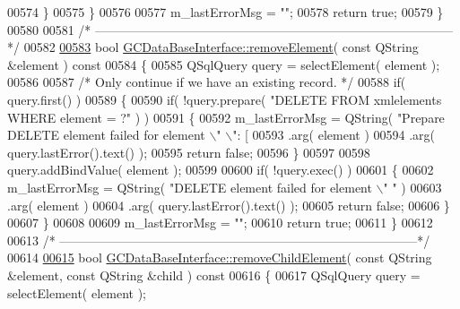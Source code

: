 \begin{DoxyCode}
{{{{{{{{{{{{{{{{{{{{{{{{{{00574     \}
00575   \}
00576 
00577   m\_lastErrorMsg = \textcolor{stringliteral}{""};
00578   \textcolor{keywordflow}{return} \textcolor{keyword}{true};
00579 \}
00580 
00581 \textcolor{comment}{/*
      --------------------------------------------------------------------------------------*/}
00582 
\hypertarget{gcdatabaseinterface_8cpp_source_l00583}{}\hyperlink{class_g_c_data_base_interface_ad8aa20de89390f0cc2a1b64270a831b3}{00583} \textcolor{keywordtype}{bool} \hyperlink{class_g_c_data_base_interface_ad8aa20de89390f0cc2a1b64270a831b3}{GCDataBaseInterface::removeElement}( \textcolor{keyword}{const} QString &element )\textcolor{keyword}{ const}
00584 \textcolor{keyword}{}\{
00585   QSqlQuery query = selectElement( element );
00586 
00587   \textcolor{comment}{/* Only continue if we have an existing record. */}
00588   \textcolor{keywordflow}{if}( query.first() )
00589   \{
00590     \textcolor{keywordflow}{if}( !query.prepare( \textcolor{stringliteral}{"DELETE FROM xmlelements WHERE element = ?"} ) )
00591     \{
00592       m\_lastErrorMsg = QString( \textcolor{stringliteral}{"Prepare DELETE element failed for element \(\backslash\)"%
      \(\backslash\)": [%
00593                        .arg( element )
00594                        .arg( query.lastError().text() );
00595       \textcolor{keywordflow}{return} \textcolor{keyword}{false};
00596     \}
00597 
00598     query.addBindValue( element );
00599 
00600     \textcolor{keywordflow}{if}( !query.exec() )
00601     \{
00602       m\_lastErrorMsg = QString( \textcolor{stringliteral}{"DELETE element failed for element \(\backslash\)"%
      "} )
00603                        .arg( element )
00604                        .arg( query.lastError().text() );
00605       \textcolor{keywordflow}{return} \textcolor{keyword}{false};
00606     \}
00607   \}
00608 
00609   m\_lastErrorMsg = \textcolor{stringliteral}{""};
00610   \textcolor{keywordflow}{return} \textcolor{keyword}{true};
00611 \}
00612 
00613 \textcolor{comment}{/*
      --------------------------------------------------------------------------------------*/}
00614 
\hypertarget{gcdatabaseinterface_8cpp_source_l00615}{}\hyperlink{class_g_c_data_base_interface_a657f2885b6741f8ac229939f77e7dd73}{00615} \textcolor{keywordtype}{bool} \hyperlink{class_g_c_data_base_interface_a657f2885b6741f8ac229939f77e7dd73}{GCDataBaseInterface::removeChildElement}( \textcolor{keyword}{const} QString &element, \textcolor{keyword}{const} 
      QString &child )\textcolor{keyword}{ const}
00616 \textcolor{keyword}{}\{
00617   QSqlQuery query = selectElement( element );
}}}}}}}}}}}}}}}}}}}}}}}}}}}
\end{DoxyCode}
